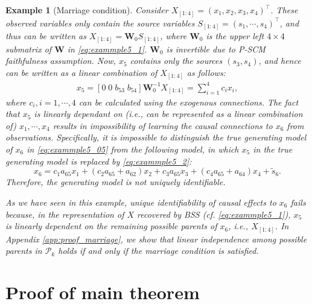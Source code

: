 \documentclass[12pt]{article}
\newtheorem{example}{Example}
\newcommand{\bW}{\mathbf{W}}
\begin{document}
\begin{example}[Marriage condition]
Consider $X_{[1:4]}=(x_1, x_2, x_3, x_4)^{\top}$. These observed variables only contain the source variables $S_{[1:4]}=(s_1,\cdots, s_4)^{\top}$, and thus can be written as $X_{[1:4]}=\bW_0 S_{[1:4]}$, where $\bW_0$ is the upper left $4\times 4$ submatrix of $\bW$ in \eqref{eq:exammple5_1}. $\bW_0$ is invertible due to P-SCM faithfulness assumption. Now, $x_5$ contains only the sources $(s_3,s_4)$, and hence can be written as a linear combination of $X_{[1:4]}$ as follows:
\begin{align}
x_5 = [0 \;0\;b_{53}\;b_{54}] \bW^{-1}_0 X_{[1:4]}
=\sum_{i=1}^4 c_{i} x_i,
\label{eq:exammple5_2}
\end{align}
where $c_i, i=1,\cdots,4$ can be calculated using the exogenous connections.
The fact that $x_5$ is linearly dependant on (i.e., can be represented as a linear combination of) $x_1,\cdots,x_4$ results in impossibility of learning the causal connections to $x_6$ from observations. Specifically, it is impossible to distinguish the true generating model of $x_6$ in \eqref{eq:exammple5_05} from the following model, in which $x_5$ in the true generating model is replaced by \eqref{eq:exammple5_2}:
\begin{equation}
x_6 = c_1 a_{65} x_1 + (c_2a_{65} + a_{62}) x_2 + c_3a_{65} x_3 + (c_4a_{65} + a_{64}) x_4 + \tilde{s}_6.
\end{equation}
Therefore, the generating model is not uniquely identifiable. 

As we have seen in this example, unique identifiability of causal effects to $x_6$ fails because, in the representation of $X$ recovered by BSS (cf. \eqref{eq:exammple5_1}),  $x_5$ is linearly dependent on the remaining possible parents of $x_6$, i.e., $X_{[1:4]}$.
In Appendix \ref{app:proof_marriage}, we show that linear independence among possible parents in $\mathcal{P}_k$ holds if and only if the marriage condition is satisfied.
\end{example}


\section{Proof of main theorem}\label{app:proof_main_theorem}
\end{document}
